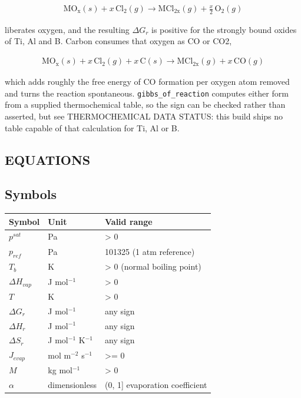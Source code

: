 \documentclass[10pt,a4paper,twoside]{report}
\begin{document}
\begin{equation*}
\begin{gathered}
\mathrm{MO_x}(s) + x\,\mathrm{Cl_2}(g) \rightarrow \mathrm{MCl_{2x}}(g) + \tfrac{x}{2}\,\mathrm{O_2}(g)
\end{gathered}
\end{equation*}

liberates oxygen, and the resulting $\Delta G_r$ is positive for the strongly bound oxides of Ti, Al and B. Carbon consumes that oxygen as CO or CO2,

\begin{equation*}
\begin{gathered}
\mathrm{MO_x}(s) + x\,\mathrm{Cl_2}(g) + x\,\mathrm{C}(s) \rightarrow \mathrm{MCl_{2x}}(g) + x\,\mathrm{CO}(g)
\end{gathered}
\end{equation*}

which adds roughly the free energy of CO formation per oxygen atom removed and turns the reaction spontaneous. \texttt{gibbs\_of\_reaction} computes either form from a supplied thermochemical table, so the sign can be checked rather than asserted, but see THERMOCHEMICAL DATA STATUS: this build ships no table capable of that calculation for Ti, Al or B.

\subsection*{EQUATIONS}

\subsection*{Symbols}

\begin{center}
\footnotesize
\begin{tabular}{@{}llp{}@{}}
\toprule
Symbol & Unit & Valid range \\
\midrule
$p^{sat}$ & Pa & > 0 \\
$p_{ref}$ & Pa & 101325 (1 atm reference) \\
$T_b$ & K & > 0 (normal boiling point) \\
$\Delta H_{vap}$ & J mol$^{-1}$ & > 0 \\
$T$ & K & > 0 \\
$\Delta G_r$ & J mol$^{-1}$ & any sign \\
$\Delta H_r$ & J mol$^{-1}$ & any sign \\
$\Delta S_r$ & J mol$^{-1}$ K$^{-1}$ & any sign \\
$J_{evap}$ & mol m$^{-2}$ s$^{-1}$ & >= 0 \\
$M$ & kg mol$^{-1}$ & > 0 \\
$\alpha$ & dimensionless & (0, 1] evaporation coefficient \\
\bottomrule
\end{tabular}
\end{center}
\end{document}
